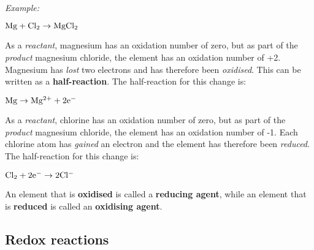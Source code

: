 \textit{Example:}


\begin{center}
$\rm{Mg + Cl_{2} \rightarrow MgCl_{2}}$
\end{center}

As a \textit{reactant}, magnesium has an oxidation number of zero, but as part of the \textit{product} magnesium chloride, the element has an oxidation number of +2. Magnesium has \textit{lost} two electrons and has therefore been \textit{oxidised}. This can be written as a \textbf{half-reaction}. The half-reaction for this change is:

\begin{center}
$\rm{Mg \rightarrow Mg^{2+} + 2e^{-}}$
\end{center}

As a \textit{reactant}, chlorine has an oxidation number of zero, but as part of the \textit{product} magnesium chloride, the element has an oxidation number of -1. Each chlorine atom has \textit{gained} an electron and the element has therefore been \textit{reduced}. The half-reaction for this change is:

\begin{center}
$\rm{Cl_{2} + 2e^{-} \rightarrow 2Cl^{-}}$
\end{center}



An element that is \textbf{oxidised} is called a \textbf{reducing agent}, while an element that is \textbf{reduced} is called an \textbf{oxidising agent}.

\subsection{Redox reactions}


